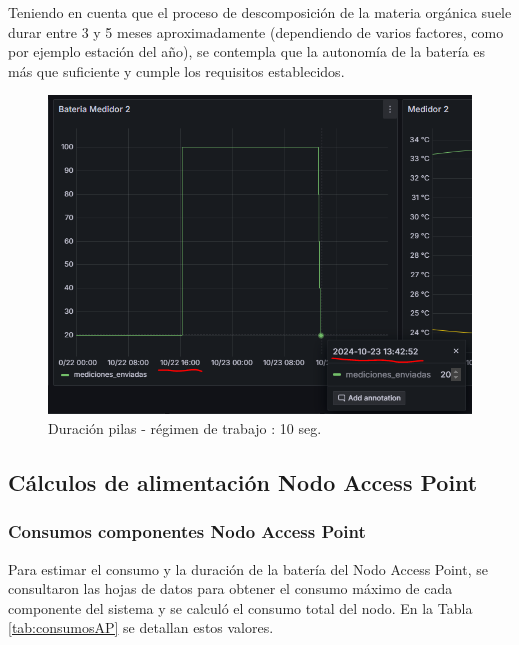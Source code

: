 Teniendo en cuenta que el proceso de descomposición de la materia orgánica suele durar entre 3 y 5 meses aproximadamente (dependiendo de varios factores, como por ejemplo estación del año), se contempla que la autonomía de la batería es más que suficiente y cumple los requisitos establecidos.

\begin{figure}[H]
	\centering
	\includegraphics[scale=0.9]{./Figures/Pruebas/duracion_pila.png}
	\caption{Duración pilas - régimen de trabajo : 10 seg.}
	\label{fig:PruebaBateria}
\end{figure}



\subsection{Cálculos de alimentación Nodo Access Point}
\subsubsection{Consumos componentes Nodo Access Point}

Para estimar el consumo y la duración de la batería del Nodo Access Point, se consultaron las hojas de datos para obtener el consumo máximo de cada componente del sistema y se calculó el consumo total del nodo. En la Tabla \ref{tab:consumosAP} se detallan estos valores.

